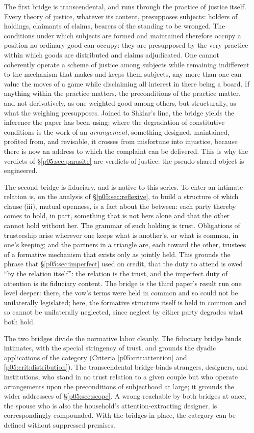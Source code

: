 \documentclass[11pt,a4paper]{article}
\theoremstyle{seriesthm}
\begin{document}
The first bridge is transcendental, and runs through the practice of justice itself. Every theory of justice, whatever its content, presupposes subjects: holders of holdings, claimants of claims, bearers of the standing to be wronged. The conditions under which subjects are formed and maintained therefore occupy a position no ordinary good can occupy: they are presupposed by the very practice within which goods are distributed and claims adjudicated. One cannot coherently operate a scheme of justice among subjects while remaining indifferent to the mechanism that makes and keeps them subjects, any more than one can value the moves of a game while disclaiming all interest in there being a board. If anything within the practice matters, the preconditions of the practice matter, and not derivatively, as one weighted good among others, but structurally, as what the weighing presupposes. Joined to Shklar's line, the bridge yields the inference the paper has been using: where the degradation of constitutive conditions is the work of an \emph{arrangement}, something designed, maintained, profited from, and revisable, it crosses from misfortune into injustice, because there is now an address to which the complaint can be delivered. This is why the verdicts of §\ref{p05:sec:parasite} are verdicts of justice: the pseudo-shared object is engineered.

The second bridge is fiduciary, and is native to this series. To enter an intimate relation is, on the analysis of §\ref{p05:sec:reflexive}, to build a structure of which clause (iii), mutual openness, is a fact about the between: each party thereby comes to hold, in part, something that is not hers alone and that the other cannot hold without her. The grammar of such holding is trust. Obligations of trusteeship arise wherever one keeps what is another's, or what is common, in one's keeping; and the partners in a triangle are, each toward the other, trustees of a formative mechanism that exists only as jointly held. This grounds the phrase that §\ref{p05:sec:imperfect} used on credit, that the duty to attend is owed ``by the relation itself'': the relation is the trust, and the imperfect duty of attention is its fiduciary content. The bridge is the third paper's result run one level deeper: there, the vow's terms were held in common and so could not be unilaterally legislated; here, the formative structure itself is held in common and so cannot be unilaterally neglected, since neglect by either party degrades what both hold.

The two bridges divide the normative labor cleanly. The fiduciary bridge binds intimates, with the special stringency of trust, and grounds the dyadic applications of the category (Criteria \ref{p05:crit:attention} and \ref{p05:crit:distribution}). The transcendental bridge binds strangers, designers, and institutions, who stand in no trust relation to a given couple but who operate arrangements upon the preconditions of subjecthood at large; it grounds the wider addressees of §\ref{p05:sec:scope}. A wrong reachable by both bridges at once, the spouse who is also the household's attention-extracting designer, is correspondingly compounded. With the bridges in place, the category can be defined without suppressed premises.
\end{document}
